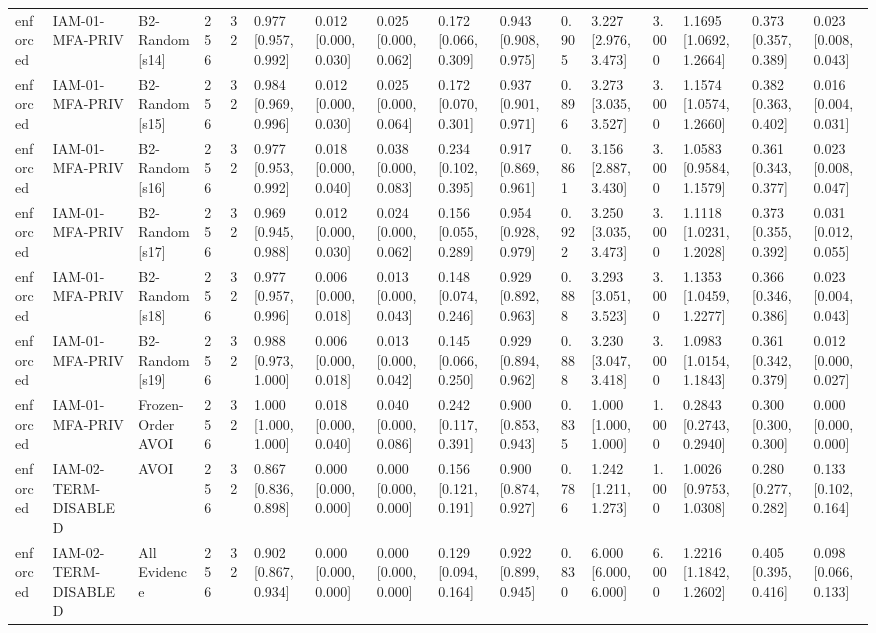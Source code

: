 \begin{table}[!ht]
{\begin{tabular}{llllllllllllllll}
enforced & IAM-01-MFA-PRIV & B2-Random[s14] & 256 & 32 & 0.977 [0.957, 0.992] & 0.012 [0.000, 0.030] & 0.025 [0.000, 0.062] & 0.172 [0.066, 0.309] & 0.943 [0.908, 0.975] & 0.905 & 3.227 [2.976, 3.473] & 3.000 & 1.1695 [1.0692, 1.2664] & 0.373 [0.357, 0.389] & 0.023 [0.008, 0.043] \\
enforced & IAM-01-MFA-PRIV & B2-Random[s15] & 256 & 32 & 0.984 [0.969, 0.996] & 0.012 [0.000, 0.030] & 0.025 [0.000, 0.064] & 0.172 [0.070, 0.301] & 0.937 [0.901, 0.971] & 0.896 & 3.273 [3.035, 3.527] & 3.000 & 1.1574 [1.0574, 1.2660] & 0.382 [0.363, 0.402] & 0.016 [0.004, 0.031] \\
enforced & IAM-01-MFA-PRIV & B2-Random[s16] & 256 & 32 & 0.977 [0.953, 0.992] & 0.018 [0.000, 0.040] & 0.038 [0.000, 0.083] & 0.234 [0.102, 0.395] & 0.917 [0.869, 0.961] & 0.861 & 3.156 [2.887, 3.430] & 3.000 & 1.0583 [0.9584, 1.1579] & 0.361 [0.343, 0.377] & 0.023 [0.008, 0.047] \\
enforced & IAM-01-MFA-PRIV & B2-Random[s17] & 256 & 32 & 0.969 [0.945, 0.988] & 0.012 [0.000, 0.030] & 0.024 [0.000, 0.062] & 0.156 [0.055, 0.289] & 0.954 [0.928, 0.979] & 0.922 & 3.250 [3.035, 3.473] & 3.000 & 1.1118 [1.0231, 1.2028] & 0.373 [0.355, 0.392] & 0.031 [0.012, 0.055] \\
enforced & IAM-01-MFA-PRIV & B2-Random[s18] & 256 & 32 & 0.977 [0.957, 0.996] & 0.006 [0.000, 0.018] & 0.013 [0.000, 0.043] & 0.148 [0.074, 0.246] & 0.929 [0.892, 0.963] & 0.888 & 3.293 [3.051, 3.523] & 3.000 & 1.1353 [1.0459, 1.2277] & 0.366 [0.346, 0.386] & 0.023 [0.004, 0.043] \\
enforced & IAM-01-MFA-PRIV & B2-Random[s19] & 256 & 32 & 0.988 [0.973, 1.000] & 0.006 [0.000, 0.018] & 0.013 [0.000, 0.042] & 0.145 [0.066, 0.250] & 0.929 [0.894, 0.962] & 0.888 & 3.230 [3.047, 3.418] & 3.000 & 1.0983 [1.0154, 1.1843] & 0.361 [0.342, 0.379] & 0.012 [0.000, 0.027] \\
enforced & IAM-01-MFA-PRIV & Frozen-Order AVOI & 256 & 32 & 1.000 [1.000, 1.000] & 0.018 [0.000, 0.040] & 0.040 [0.000, 0.086] & 0.242 [0.117, 0.391] & 0.900 [0.853, 0.943] & 0.835 & 1.000 [1.000, 1.000] & 1.000 & 0.2843 [0.2743, 0.2940] & 0.300 [0.300, 0.300] & 0.000 [0.000, 0.000] \\
enforced & IAM-02-TERM-DISABLED & AVOI & 256 & 32 & 0.867 [0.836, 0.898] & 0.000 [0.000, 0.000] & 0.000 [0.000, 0.000] & 0.156 [0.121, 0.191] & 0.900 [0.874, 0.927] & 0.786 & 1.242 [1.211, 1.273] & 1.000 & 1.0026 [0.9753, 1.0308] & 0.280 [0.277, 0.282] & 0.133 [0.102, 0.164] \\
enforced & IAM-02-TERM-DISABLED & All Evidence & 256 & 32 & 0.902 [0.867, 0.934] & 0.000 [0.000, 0.000] & 0.000 [0.000, 0.000] & 0.129 [0.094, 0.164] & 0.922 [0.899, 0.945] & 0.830 & 6.000 [6.000, 6.000] & 6.000 & 1.2216 [1.1842, 1.2602] & 0.405 [0.395, 0.416] & 0.098 [0.066, 0.133] \\

\end{tabular}}
\end{table}
